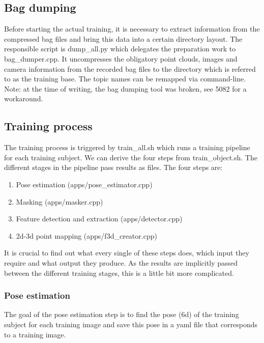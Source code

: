 \subsection*{Bag dumping}

Before starting the actual training, it is necessary
to extract information from the compressed bag files and bring this data into a
certain directory layout. The responsible script is dump\_all.py which
delegates the preparation work to bag\_dumper.cpp. It uncompresses the
obligatory point clouds, images and camera information from the recorded bag
files to the directory which is referred to as the training base. The topic
names can be remapped via command-line. Note: at the time of writing, the bag
dumping tool was broken, see 5082 for a workaround.



\subsection*{Training process}

The training process is triggered by train\_all.sh which runs a training
pipeline for each training subject. We can derive the four steps from
train\_object.sh. The different stages in the pipeline pass results as files.
The four steps are:

\begin{enumerate}
    \item Pose estimation (apps/pose\_estimator.cpp)
    \item Masking (apps/masker.cpp)
    \item Feature detection and extraction  (apps/detector.cpp)
    \item 2d-3d point mapping  (apps/f3d\_creator.cpp)
\end{enumerate}

It is crucial to find out what every single of these steps does, which input
they require and what output they produce. As the results are implicitly passed
between the different training stages, this is a little bit more complicated.


\subsubsection*{Pose estimation}

The goal of the pose estimation step is to find the pose (6d) of the training
subject for each training image and save this pose in a yaml file that
corresponds to a training image.

